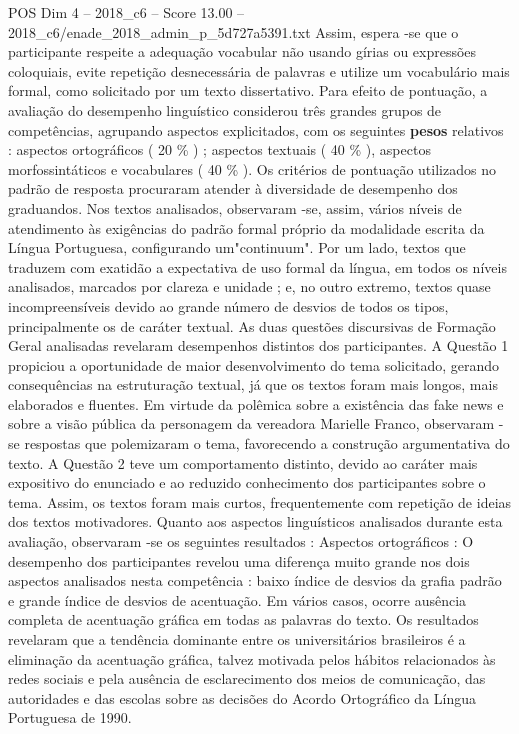 \begin{textsample}{POS Dim 4 – 2018\_c6 – Score 13.00 – 2018\_c6/enade\_2018\_admin\_p\_5d727a5391.txt}
Assim, espera -se que o participante respeite a adequação vocabular não usando gírias ou expressões coloquiais, evite repetição desnecessária de palavras e utilize um vocabulário mais formal, como solicitado por um texto dissertativo.
Para efeito de pontuação, a avaliação do desempenho linguístico considerou três grandes grupos de competências, agrupando aspectos explicitados, com os seguintes \textbf{pesos} relativos : aspectos ortográficos ( 20 \% ) ; aspectos textuais ( 40 \% ), aspectos morfossintáticos e vocabulares ( 40 \% ).
Os critérios de pontuação utilizados no padrão de resposta procuraram atender à diversidade de desempenho dos graduandos.
Nos textos analisados, observaram -se, assim, vários níveis de atendimento às exigências do padrão formal próprio da modalidade escrita da Língua Portuguesa, configurando um"continuum".
Por um lado, textos que traduzem com exatidão a expectativa de uso formal da língua, em todos os níveis analisados, marcados por clareza e unidade ; e, no outro extremo, textos quase incompreensíveis devido ao grande número de desvios de todos os tipos, principalmente os de caráter textual.
As duas questões discursivas de Formação Geral analisadas revelaram desempenhos distintos dos participantes.
A Questão 1 propiciou a oportunidade de maior desenvolvimento do tema solicitado, gerando consequências na estruturação textual, já que os textos foram mais longos, mais elaborados e fluentes.
Em virtude da polêmica sobre a existência das fake news e sobre a visão pública da personagem da vereadora Marielle Franco, observaram -se respostas que polemizaram o tema, favorecendo a construção argumentativa do texto.
A Questão 2 teve um comportamento distinto, devido ao caráter mais expositivo do enunciado e ao reduzido conhecimento dos participantes sobre o tema.
Assim, os textos foram mais curtos, frequentemente com repetição de ideias dos textos motivadores.
Quanto aos aspectos linguísticos analisados durante esta avaliação, observaram -se os seguintes resultados : Aspectos ortográficos : O desempenho dos participantes revelou uma diferença muito grande nos dois aspectos analisados nesta competência : baixo índice de desvios da grafia padrão e grande índice de desvios de acentuação.
Em vários casos, ocorre ausência completa de acentuação gráfica em todas as palavras do texto.
Os resultados revelaram que a tendência dominante entre os universitários brasileiros é a eliminação da acentuação gráfica, talvez motivada pelos hábitos relacionados às redes sociais e pela ausência de esclarecimento dos meios de comunicação, das autoridades e das escolas sobre as decisões do Acordo Ortográfico da Língua Portuguesa de 1990.

\end{textsample}
